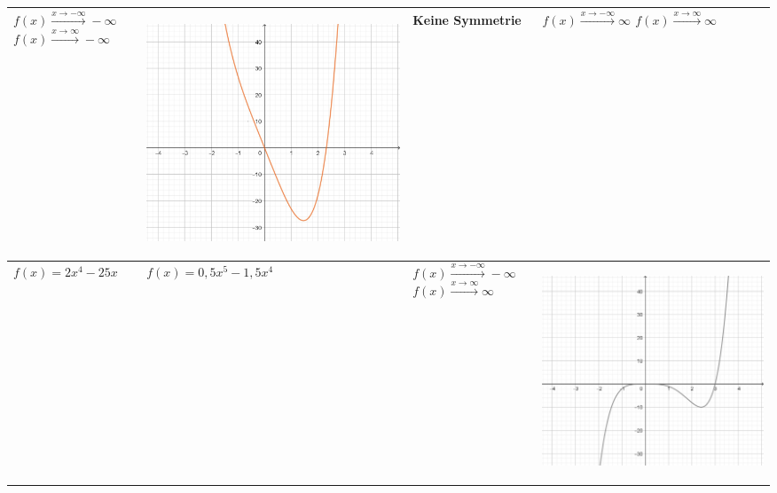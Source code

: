 \documentclass[oneside,openany,headings=optiontotoc,11pt,numbers=noenddot]{scrreprt}
\begin{document}
	\newpage
	\begin{table}
		\begin{tabular}{|M{4.35cm}|M{4.35cm}||M{4.35cm}|M{4.35cm}|}
			\hline
			 & 
			\begin{center}\includegraphics[scale=0.15]{04-GanzrationaleFunktionen/k1.jpg}\end{center} & Keine Symmetrie &  \\
			\hline
			\(f(x)=2x^4-25x\)  & \(f(x)=0,5x^5-1,5x^4\)  &  &  \begin{center}\includegraphics[scale=0.15]{04-GanzrationaleFunktionen/l1.jpg}\end{center}\\

\end{tabular}
\end{table}
\end{document}

